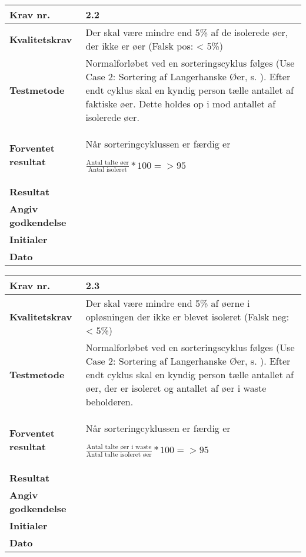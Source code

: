 \newpage

 	\begin{center}
		\begin{longtable}{ | m{4cm}| m{8.5cm}|} 
			\hline
			\textbf{Krav nr.} & 2.2 \\ 
			\hline
			\textbf{Kvalitetskrav} & Der skal være mindre end 5\% af de isolerede øer, der ikke er øer
(Falsk pos: < 5\%) \\
			\hline
			\textbf{Testmetode} & Normalforløbet ved en sorteringscyklus følges (Use Case 2: Sortering af Langerhanske Øer, s.  \pageref{uc:2}). Efter endt cyklus skal en kyndig person tælle antallet af faktiske øer. Dette holdes op i mod antallet af isolerede øer.  \\
			\hline
			\textbf{Forventet resultat}  & Når sorteringcyklussen er færdig er

$\frac{\text{Antal talte øer}}{\text{Antal isoleret}}*100=>95$  \\
			\hline
			\textbf{Resultat}  &    \\
			\hline
			\textbf{Angiv godkendelse} &     \\
			\hline
			\textbf{Initialer} &     \\
			\hline
			\textbf{Dato} &    \\
			\hline
		\end{longtable}
	\end{center}	
			
 	\begin{center}
		\begin{longtable}{ | m{4cm}| m{8.5cm}|} 
			\hline
			\textbf{Krav nr.} & 2.3 \\ 
			\hline
			\textbf{Kvalitetskrav} & Der skal være mindre end 5\% af øerne i opløsningen der ikke er blevet isoleret
(Falsk neg: < 5\%) \\
			\hline
			\textbf{Testmetode} & Normalforløbet ved en sorteringscyklus følges (Use Case 2: Sortering af Langerhanske Øer, s.  \pageref{uc:2}). Efter endt cyklus skal en kyndig person tælle antallet af øer, der er isoleret og antallet af øer i waste beholderen.  \\
			\hline
			\textbf{Forventet resultat}  & Når sorteringcyklussen er færdig er

$\frac{\text{Antal talte øer i waste}}{\text{Antal talte isoleret øer}}*100= >95$  \\
			\hline
			\textbf{Resultat}  &    \\
			\hline
			\textbf{Angiv godkendelse} &     \\
			\hline
			\textbf{Initialer} &     \\
			\hline
			\textbf{Dato} &    \\
			\hline
		\end{longtable}
	\end{center}		

